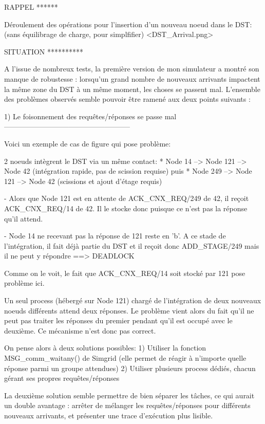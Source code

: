 RAPPEL
******

Déroulement des opérations pour l'insertion d'un nouveau noeud dans le DST: (sans équilibrage de
charge, pour simplfifier)
<DST_Arrival.png>


SITUATION
**********

A l'issue de nombreux tests, la première version de mon simulateur a montré son manque de robustesse
: lorsqu'un grand nombre de nouveaux arrivants impactent la même zone du DST à un même moment, les
choses se passent mal.
L'ensemble des problèmes observés semble pouvoir être ramené aux deux points suivants :

1) Le foisonnement des requêtes/réponses se passe mal
-----------------------------------------------------

Voici un exemple de cas de figure qui pose problème:

2 noeuds intègrent le DST via un même contact:
 * Node 14 --> Node 121 --> Node 42 (intégration rapide, pas de scission requise)
   puis
 * Node 249 --> Node 121 --> Node 42 (scissions et ajout d'étage requis)

 - Alors que Node 121 est en attente de ACK_CNX_REQ/249 de 42, il reçoit ACK_CNX_REQ/14 de 42. Il le
   stocke donc puisque ce n'est pas la réponse qu'il attend.

 - Node 14 ne recevant pas la réponse de 121 reste en 'b'.
   A ce stade de l'intégration, il fait déjà partie du DST et il reçoit donc ADD_STAGE/249 mais il
   ne peut y répondre ==> DEADLOCK

Comme on le voit, le fait que ACK_CNX_REQ/14 soit stocké par 121 pose problème ici.

Un seul process (hébergé sur Node 121) chargé de l'intégration de deux nouveaux noeuds différents
attend deux réponses. Le problème vient alors du fait qu'il ne peut pas traiter les réponses du
premier pendant qu'il est occupé avec le deuxième. Ce mécanisme n'est donc pas correct.

On pense alors à deux solutions possibles:
1) Utiliser la fonction MSG_comm_waitany() de Simgrid
   (elle permet de réagir à n'importe quelle réponse parmi un groupe attendues)
2) Utiliser plusieurs process dédiés, chacun gérant ses propres requêtes/réponses

La deuxième solution semble permettre de bien séparer les tâches, ce qui aurait un double avantage :
arrêter de mélanger les requêtes/réponses pour différents nouveaux arrivants, et présenter une
trace d'exécution plus lisible.

